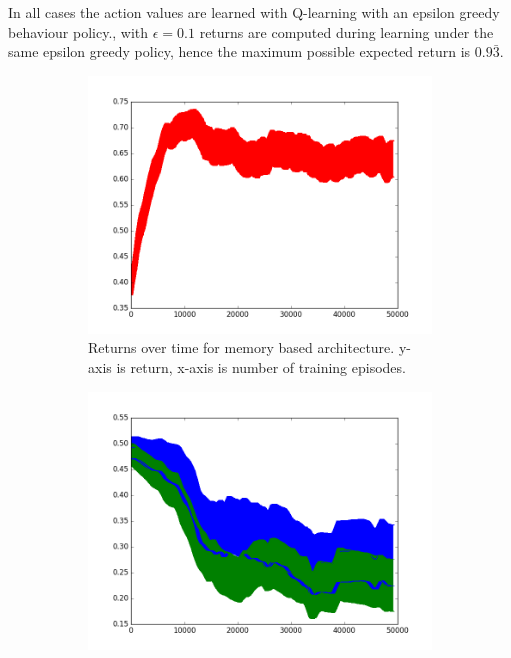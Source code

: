 \documentclass{article}
\begin{document}
In all cases the action values are learned with Q-learning with an epsilon greedy behaviour policy., with $\epsilon=0.1$ returns are computed during learning under the same epsilon greedy policy, hence the maximum possible expected return is $0.9\bar{3}$.
\begin{figure}[!ht]
\centering
\begin{subfigure}[t]{.45\textwidth}
  \centering
      \includegraphics[width=1\textwidth]{images/1_query_mem_ret.png}
  \caption{Returns over time for memory based architecture. y-axis is return, x-axis is number of training episodes.}
  \label{fig:1_query_ret}
\end{subfigure}\hfill
\begin{subfigure}[t]{.45\textwidth}
  \centering
      \includegraphics[width=1\textwidth]{images/1_query_mem_writes.png}

\end{subfigure}
\end{figure}
\end{document}
